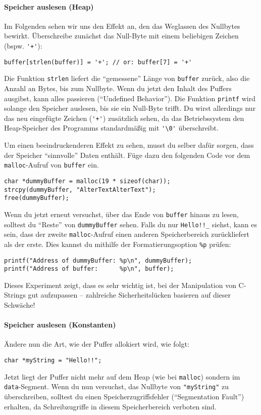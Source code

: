 \paragraph{Speicher auslesen (Heap)}
Im Folgenden sehen wir uns den Effekt an, den das Weglassen des Nullbytes bewirkt.
Überschreibe zunächst das Null-Byte mit einem beliebigen Zeichen (bspw. \lstinline|'+'|):
\begin{lstlisting}
buffer[strlen(buffer)] = '+'; // or: buffer[7] = '+'
\end{lstlisting}
Die Funktion \lstinline|strlen| liefert die \enquote{gemessene} Länge von \lstinline|buffer| zurück, also die Anzahl an Bytes, bis zum Nullbyte.
Wenn du jetzt den Inhalt des Puffers ausgibst, kann alles passieren (\enquote{Undefined Behavior}).
Die Funktion \lstinline|printf| wird solange den Speicher auslesen, bis sie ein Null-Byte trifft.
Du wirst allerdings nur das neu eingefügte Zeichen (\lstinline|'+'|) zusätzlich sehen, da das Betriebssystem den Heap-Speicher des Programms standardmäßig mit \lstinline|'\0'| überschreibt.

Um einen beeindruckenderen Effekt zu sehen, musst du selber dafür sorgen, dass der Speicher \enquote{sinnvolle} Daten enthält.
Füge dazu den folgenden Code vor dem \lstinline|malloc|-Aufruf von \lstinline|buffer| ein.
\begin{lstlisting}
char *dummyBuffer = malloc(19 * sizeof(char));
strcpy(dummyBuffer, "AlterTextAlterText");
free(dummyBuffer);
\end{lstlisting}
Wenn du jetzt erneut versuchst, über das Ende von \lstinline|buffer| hinaus zu lesen, solltest du \enquote{Reste} von \lstinline|dummyBuffer| sehen.
Falls du nur \lstinline|Hello!!_| siehst, kann es sein, dass der zweite \lstinline|malloc|-Aufruf einen anderen Speicherbereich zurückliefert als der erste.
Dies kannst du mithilfe der Formatierungsoption \lstinline|%p| prüfen:
\begin{lstlisting}
printf("Address of dummyBuffer: %p\n", dummyBuffer);
printf("Address of buffer:      %p\n", buffer);
\end{lstlisting}
Dieses Experiment zeigt, dass es sehr wichtig ist, bei der Manipulation von C-Strings gut aufzupassen -- 
zahlreiche Sicherheitslücken basieren auf dieser Schwäche!

\paragraph{Speicher auslesen (Konstanten)}
Ändere nun die Art, wie der Puffer allokiert wird, wie folgt:
\begin{lstlisting}
char *myString = "Hello!!";
\end{lstlisting}
Jetzt liegt der Puffer nicht mehr auf dem Heap (wie bei \lstinline|malloc|) sondern im \texttt{data}-Segment.
Wenn du nun versuchst, das Nullbyte von \lstinline|"myString"| zu überschreiben, solltest du einen Speicherzugriffsfehler (\enquote{Segmentation Fault}) erhalten, da Schreibzugriffe in diesem Speicherbereich verboten sind.

